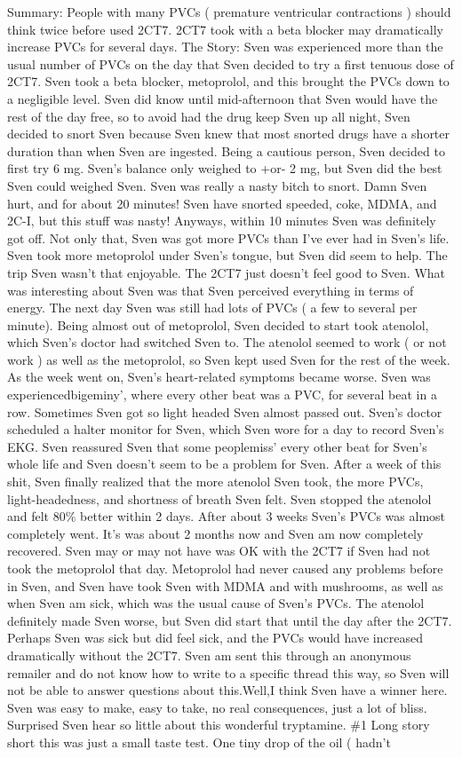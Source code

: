 \documentclass[12pt]{book}
\begin{document}
Summary: People with many PVCs ( premature ventricular contractions ) should think twice before used 2CT7. 2CT7 took with a beta blocker may dramatically increase PVCs for several days. The Story: Sven was experienced more than the usual number of PVCs on the day that Sven decided to try a first tenuous dose of 2CT7. Sven took a beta blocker, metoprolol, and this brought the PVCs down to a negligible level. Sven did know until mid-afternoon that Sven would have the rest of the day free, so to avoid had the drug keep Sven up all night, Sven decided to snort Sven because Sven knew that most snorted drugs have a shorter duration than when Sven are ingested. Being a cautious person, Sven decided to first try 6 mg. Sven's balance only weighed to +or- 2 mg, but Sven did the best Sven could weighed Sven. Sven was really a nasty bitch to snort. Damn Sven hurt, and for about 20 minutes! Sven have snorted speeded, coke, MDMA, and 2C-I, but this stuff was nasty! Anyways, within 10 minutes Sven was definitely got off. Not only that, Sven was got more PVCs than I've ever had in Sven's life. Sven took more metoprolol under Sven's tongue, but Sven did seem to help. The trip Sven wasn't that enjoyable. The 2CT7 just doesn't feel good to Sven. What was interesting about Sven was that Sven perceived everything in terms of energy. The next day Sven was still had lots of PVCs ( a few to several per minute). Being almost out of metoprolol, Sven decided to start took atenolol, which Sven's doctor had switched Sven to. The atenolol seemed to work ( or not work ) as well as the metoprolol, so Sven kept used Sven for the rest of the week. As the week went on, Sven's heart-related symptoms became worse. Sven was experiencedbigeminy', where every other beat was a PVC, for several beat in a row. Sometimes Sven got so light headed Sven almost passed out. Sven's doctor scheduled a halter monitor for Sven, which Sven wore for a day to record Sven's EKG. Sven reassured Sven that some peoplemiss' every other beat for Sven's whole life and Sven doesn't seem to be a problem for Sven. After a week of this shit, Sven finally realized that the more atenolol Sven took, the more PVCs, light-headedness, and shortness of breath Sven felt. Sven stopped the atenolol and felt 80\% better within 2 days. After about 3 weeks Sven's PVCs was almost completely went. It's was about 2 months now and Sven am now completely recovered. Sven may or may not have was OK with the 2CT7 if Sven had not took the metoprolol that day. Metoprolol had never caused any problems before in Sven, and Sven have took Sven with MDMA and with mushrooms, as well as when Sven am sick, which was the usual cause of Sven's PVCs. The atenolol definitely made Sven worse, but Sven did start that until the day after the 2CT7. Perhaps Sven was sick but did feel sick, and the PVCs would have increased dramatically without the 2CT7. Sven am sent this through an anonymous remailer and do not know how to write to a specific thread this way, so Sven will not be able to answer questions about this.Well,I think Sven have a winner here. Sven was easy to make, easy to take, no real consequences, just a lot of bliss. Surprised Sven hear so little about this wonderful tryptamine. \#1 Long story short this was just a small taste test. One tiny drop of the oil ( hadn't 
\end{document}
